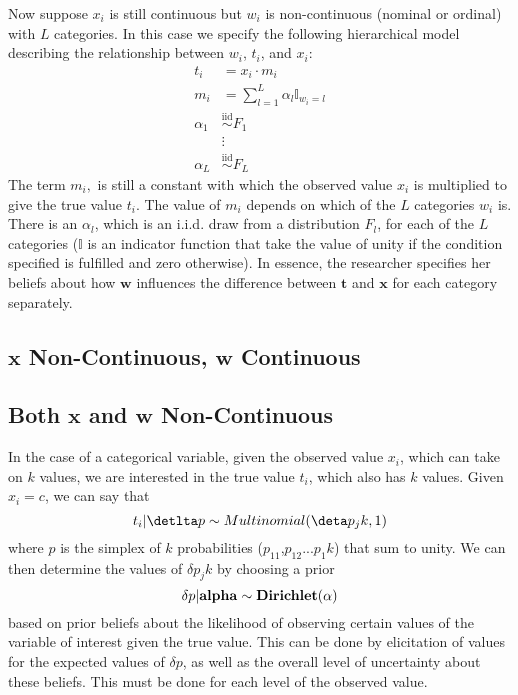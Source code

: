 \documentclass[fignum,letterpaper,12pt]{article}
\newcommand{\iid}{\stackrel{\mathrm{iid}}{\sim}}
\begin{document}
Now suppose $x_i$ is still continuous but $w_i$ is non-continuous (nominal or ordinal) with $L$ categories. In this case we specify the following hierarchical model describing the relationship between $w_i$, $t_i$, and $x_i$:
\begin{equation}
\begin{array}{rl}
t_i & = x_i \cdot m_i \\
m_{i} & = \sum_{l=1}^{L} \alpha_l \mathbb{I}_{w_i=l} \\
\alpha_1 & \iid F_1\\
& \vdots \\
\alpha_L & \iid F_L
\end{array}
\end{equation}
The term $m_i,$ is still a constant with which the observed value $x_i$ is multiplied to give the true value $t_i$. The value of $m_i$ depends on which of the $L$ categories $w_i$ is. There is an $\alpha_l$, which is an i.i.d. draw from a distribution $F_l$, for each of the $L$ categories ($\mathbb{I}$ is an indicator function that take the value of unity if the condition specified is fulfilled and zero otherwise). In essence, the researcher specifies her beliefs about how $\mathbf{w}$ influences the difference between $\mathbf{t}$ and $\mathbf{x}$ for each category separately.


\subsection{$\mathbf{x}$ Non-Continuous, $\mathbf{w}$ Continuous} \label{subsec:case3}

\subsection{Both $\mathbf{x}$ and $\mathbf{w}$ Non-Continuous} \label{subsec:case4}
In the case of a categorical variable, given the observed value $x_i$, which can take on $k$ values, we are interested in the true value $t_i$, which also has $k$ values. Given $x_i=c$, we can say that
\begin{equation}
t_i|\detlta p \sim Multinomial (\deta p_jk,1)
\end{equation}
where \delta $p$ is the simplex of $k$ probabilities ($p_11$,$p_12$...$p_1k$) that sum to unity. We can then determine the values of $\delta p_jk$ by choosing a prior
\begin{equation}
\delta p|\bf{alpha} \sim Dirichlet(\bf{\alpha})
\end{equation}
based on prior beliefs about the likelihood of observing certain values of the variable of interest given the true value. This can be done by elicitation of values for the expected values of $\delta p$, as well as the overall level of uncertainty about these beliefs. This must be done for each level of the observed value.
\end{document}
